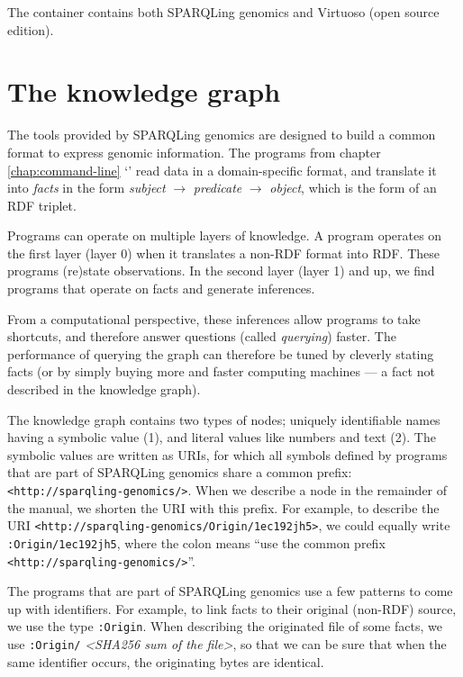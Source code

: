   The container contains both SPARQLing genomics and Virtuoso (open source
  edition).

\chapter{The knowledge graph}

  The tools provided by SPARQLing genomics are designed to build a
  common format to express genomic information.  The programs from chapter
  \ref{chap:command-line} {\color{LinkGray}`'}
  read data in a domain-specific format, and translate it into \emph{facts}
  in the form \emph{subject} $\rightarrow$ \emph{predicate} $\rightarrow$
  \emph{object}, which is the form of an RDF triplet.

  Programs can operate on multiple layers of knowledge.  A program operates
  on the first layer (layer 0) when it translates a non-RDF format into RDF.
  These programs (re)state observations.  In the second layer (layer 1) and
  up, we find programs that operate on facts and generate inferences.

  From a computational perspective, these inferences allow programs to take
  shortcuts, and therefore answer questions (called \emph{querying}) faster.
  The performance of querying the graph can therefore be tuned by cleverly
  stating facts (or by simply buying more and faster computing machines ---
  a fact not described in the knowledge graph).

  \begin{sloppypar}
  The knowledge graph contains two types of nodes; uniquely identifiable
  names having a symbolic value (1), and literal values like numbers and
  text (2).  The symbolic values are written as URIs, for which all symbols
  defined by programs that are part of SPARQLing genomics share a common
  prefix: \texttt{<http://sparqling-genomics/>}.  When we describe a node
  in the remainder of the manual, we shorten the URI with this prefix.
  For example, to describe the URI
  \texttt{<http://sparqling-genomics/Origin/1ec192jh5>}, we could equally
  write \texttt{:Origin/1ec192jh5}, where the colon means ``use the
  common prefix \texttt{<http://sparqling-genomics/>}''.
  \end{sloppypar}

  The programs that are part of SPARQLing genomics use a few patterns to
  come up with identifiers.  For example, to link facts to their original
  (non-RDF) source, we use the type \texttt{:Origin}.  When describing the
  originated file of some facts, we use \texttt{:Origin/}%
  \emph{<SHA256 sum of the file>}, so that we can be sure that when the
  same identifier occurs, the originating bytes are identical.


